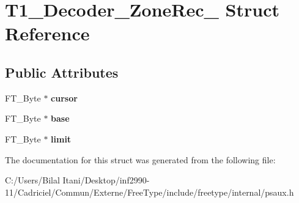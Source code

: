 \hypertarget{struct_t1___decoder___zone_rec__}{}\section{T1\+\_\+\+Decoder\+\_\+\+Zone\+Rec\+\_\+ Struct Reference}
\label{struct_t1___decoder___zone_rec__}
\subsection*{Public Attributes}
\begin{DoxyCompactItemize}
\item 
F\+T\+\_\+\+Byte $\ast$ {\bfseries cursor}\hypertarget{struct_t1___decoder___zone_rec___a14e9f190496672f6174ead91e375767d}{}\label{struct_t1___decoder___zone_rec___a14e9f190496672f6174ead91e375767d}

\item 
F\+T\+\_\+\+Byte $\ast$ {\bfseries base}\hypertarget{struct_t1___decoder___zone_rec___a9cd7e54387b238504b1e8aae47b7da7c}{}\label{struct_t1___decoder___zone_rec___a9cd7e54387b238504b1e8aae47b7da7c}

\item 
F\+T\+\_\+\+Byte $\ast$ {\bfseries limit}\hypertarget{struct_t1___decoder___zone_rec___a46fe1e4aa9bdb712ae414305f88d95db}{}\label{struct_t1___decoder___zone_rec___a46fe1e4aa9bdb712ae414305f88d95db}

\end{DoxyCompactItemize}


The documentation for this struct was generated from the following file\+:\begin{DoxyCompactItemize}
\item 
C\+:/\+Users/\+Bilal Itani/\+Desktop/inf2990-\/11/\+Cadriciel/\+Commun/\+Externe/\+Free\+Type/include/freetype/internal/psaux.\+h\end{DoxyCompactItemize}
